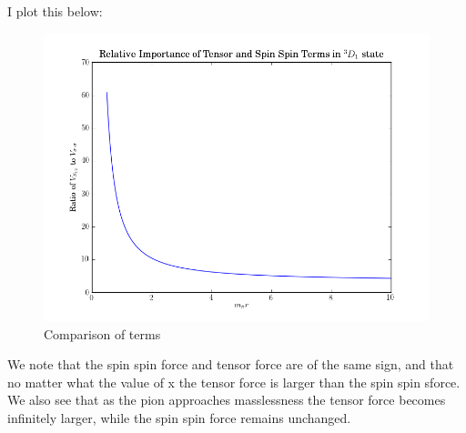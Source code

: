 \documentclass[11pt]{article} %
\begin{document}
I plot this below:\\
\begin{figure}[hbt!]
\includegraphics[width=\linewidth]{ratio}
\caption{Comparison of terms}
\end{figure}

We note that the spin spin force and tensor force are of the same sign, and that no matter what the value of x the tensor force is larger than the spin spin sforce. We also see that as the pion approaches masslessness the tensor force becomes infinitely larger, while the spin spin force remains unchanged.
\end{document}
